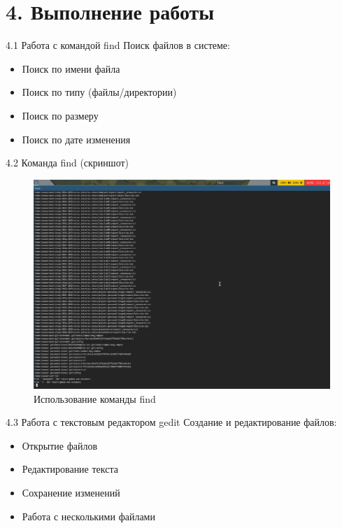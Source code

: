 \documentclass[
  ignorenonframetext,
  aspectratio=169,
  russian,
]{beamer}
\providecommand{\tightlist}{%
  \setlength{\itemsep}{0pt}\setlength{\parskip}{0pt}}
\begin{document}
\section{4. Выполнение
работы}\label{ux432ux44bux43fux43eux43bux43dux435ux43dux438ux435-ux440ux430ux431ux43eux442ux44b}

\begin{frame}{4.1 Работа с командой find}
\label{ux440ux430ux431ux43eux442ux430-ux441-ux43aux43eux43cux430ux43dux434ux43eux439-find}
Поиск файлов в системе:

\begin{itemize}[<+->]
\tightlist
\item
  Поиск по имени файла
\item
  Поиск по типу (файлы/директории)
\item
  Поиск по размеру
\item
  Поиск по дате изменения
\end{itemize}
\end{frame}

\begin{frame}{4.2 Команда find (скриншот)}
\label{ux43aux43eux43cux430ux43dux434ux430-find-ux441ux43aux440ux438ux43dux448ux43eux442}
\begin{figure}[H]

{\centering \includegraphics[width=0.8\linewidth,height=\textheight,keepaspectratio]{image/find.png}

}

\caption{Использование команды find}

\end{figure}%
\end{frame}

\begin{frame}{4.3 Работа с текстовым редактором gedit}
\label{ux440ux430ux431ux43eux442ux430-ux441-ux442ux435ux43aux441ux442ux43eux432ux44bux43c-ux440ux435ux434ux430ux43aux442ux43eux440ux43eux43c-gedit}
Создание и редактирование файлов:

\begin{itemize}[<+->]
\tightlist
\item
  Открытие файлов
\item
  Редактирование текста
\item
  Сохранение изменений
\item
  Работа с несколькими файлами
\end{itemize}
\end{frame}
\end{document}
